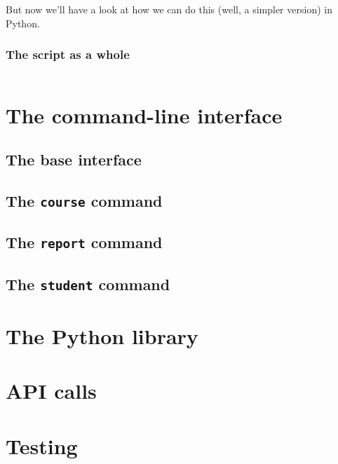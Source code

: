 \documentclass[a4paper,oneside]{memoir}
\begin{document}
But now we'll have a look at how we can do this (well, a simpler version) in 
Python.




\section{The script as a whole}

\inputminted{python}{../examples/canvas2ladok.py}


\part{The command-line interface}

\chapter{The base interface}



\chapter{The \texttt{course} command}



\chapter{The \texttt{report} command}



\chapter{The \texttt{student} command}





\part{The Python library}




\part{API calls}





\part{Testing}





\backmatter
\printbibliography
\end{document}

